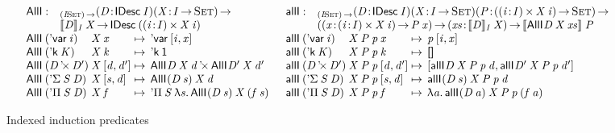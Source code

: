 \begin{figure*}

\[
\begin{array}{ll}
\stk{
\begin{array}{@{}ll}
\SYMBAllI : & _{\PI{\V{I}}{\Set}}
              \PITEL{\V{D}}{\IDesc{\V{I}}}
              \PI{\V{X}}{\V{I} \To \Set} \\
            & \idescop{\V{D}}{\V{I}}{\V{X}} \To
              \IDesc{(\SIGMA{\V{i}}{\V{I}}{\V{X}\: \V{i}})}
\end{array} \\
\begin{array}{@{}l@{}l@{\:\mapsto\:\:}l}
\AllI{\:}{(\DVar{\V{i}})}{& \V{X}}{\V{x}} &
    \DVar{\pair{\V{i}}{\V{x}}{}} \\
\AllI{\:}{(\DConst{\V{K}})}{& \V{X}}{\V{k}} &
    \DConst{\Unit} \\
\AllI{\:}{(\DProd{\V{D}}{\V{D'}})}{& \V{X}}{\pair{\V{d}}{\V{d'}}{}} &
    \DProd{\AllI{}{\V{D}}{\V{X}}{\V{d}}}{\AllI{}{\V{D'}}{\V{X}}{\V{d'}}} \\
\AllI{\:}{(\DSigma{\V{S}}{\V{D}})}{& \V{X}}{\pair{\V{s}}{\V{d}}{}} &
    \AllI{}{(\V{D}\: \V{s})}{\V{X}}{\V{d}} \\
\AllI{\:}{(\DPi{\V{S}}{\V{D}})}{& \V{X}}{\V{f}} &
    \DPi{\V{S}}{\LAM{\V{s}} \AllI{}{(\V{D}\: \V{s})}{\V{X}}{(\V{f}\: \V{s})}}
\end{array}
}
&
\stk{
\begin{array}{@{}ll}
\SYMBallI : & _{\PI{\V{I}}{\Set}}
              \PITEL{\V{D}}{\IDesc{\V{I}}}
              \PITEL{\V{X}}{\V{I} \To \Set} 
              \PI{\V{P}}{(\SIGMA{\V{i}}{\V{I}}{\V{X}\: \V{i}}) \To \Set} \\
            & (\PI{\V{x}}{\SIGMA{\V{i}}{\V{I}}{\V{X}\: \V{i}}} \V{P}\: \V{x}) \To
              \PI{\V{xs}}{\idescop{\V{D}}{\V{I}}{\V{X}}} 
              \idescop{\AllI{}{\V{D}}{\V{X}}{\V{xs}}}{}{\V{P}}
\end{array} \\
\begin{array}{@{}l@{}l@{\:\mapsto\:\:}l}
\allI{\:}{(\DVar{\V{i}})}{& \V{X}}{\V{P}}{\V{p}}{\V{x}} &
    \V{p}\: \pair{\V{i}}{\V{x}}{} \\
\allI{\:}{(\DConst{\V{K}})}{& \V{X}}{\V{P}}{\V{p}}{\V{k}} &
    \void \\
\allI{\:}{(\DProd{\V{D}}{\V{D'}})}{& \V{X}}{\V{P}}{\V{p}}{\pair{\V{d}}{\V{d'}}{}} &
    \pair{\allI{}{\V{D}}{\V{X}}{\V{P}}{\V{p}}{\V{d}}}
         {\allI{}{\V{D'}}{\V{X}}{\V{P}}{\V{p}}{\V{d'}}}{} \\
\allI{\:}{(\DSigma{\V{S}}{\V{D}})}{& \V{X}}{\V{P}}{\V{p}}{\pair{\V{s}}{\V{d}}{}} &
    \allI{}{(\V{D}\: \V{s})}{\V{X}}{\V{P}}{\V{p}}{\V{d}} \\
\allI{\:}{(\DPi{\V{S}}{\V{D}})}{& \V{X}}{\V{P}}{\V{p}}{\V{f}} &
    \LAM{\V{a}}\allI{}{(\V{D}\: \V{a})}{\V{X}}{\V{P}}{\V{p}}{(\V{f}\: \V{a})}
\end{array}
\end{array}
}
\]

\caption{Indexed induction predicates}
\label{fig:allI-predicates}

\end{figure*}


